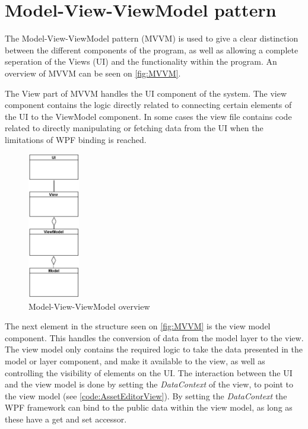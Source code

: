 \section{Model-View-ViewModel pattern} \label{sc:MVCVM}
The Model-View-ViewModel pattern (MVVM) is used to give a clear distinction between the different components of the program, as well as allowing a complete seperation of the Views (UI) and the functionality within the program. An overview of MVVM can be seen on \autoref{fig:MVVM}. 
\par
The View part of MVVM handles the UI component of the system. The view component contains the logic directly related to connecting certain elements of the UI to the ViewModel component. In some cases the view file contains code related to directly manipulating or fetching data from the UI when the limitations of WPF binding is reached.

\begin{figure}[H]
    \centering
    \includegraphics[width=0.2\textwidth]{figures/Implementation/MVVM.PNG}
    \caption{Model-View-ViewModel overview}
    \label{fig:MVVM}
\end{figure}

The next element in the structure seen on \autoref{fig:MVVM} is the view model component. This handles the conversion of data from the model layer to the view. The view model only contains the required logic to take the data presented in the model or layer component, and make it available to the view, as well as controlling the visibility of elements on the UI. The interaction between the UI and the view model is done by setting the \textit{DataContext} of the view, to point to the view model (see \autoref{code:AssetEditorView}). By setting the \textit{DataContext} the WPF framework can bind to the public data within the view model, as long as these have a get and set accessor.

